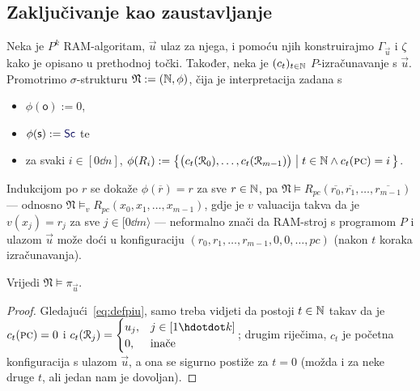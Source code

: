\subsection{Zaključivanje kao zaustavljanje}

Neka je $P^k$ RAM-algoritam, $\vec u$ ulaz za njega, i pomoću njih konstruirajmo $\Gamma_{\vec u}$ i $\zeta$ kako je opisano u prethodnoj točki.
Također, neka je $(c_t)_{t\in{\mathbb N}}$ $P$-izračunavanje s $\vec u$. Promotrimo $\sigma$-strukturu $\mathfrak N:=({\mathbb N},\phi)$, čija je interpretacija zadana s
\begin{itemize}
    \item $\phi(\mathsf o):=0$,
    \item $\phi(\mathsf s):=\f{Sc}$ te
    \item za svaki $i\in[0\dd n]$,
    $
        \phi(R_i):=\bigl\{
        \bigl(c_t(\mathcal R_{0}),\dotsc,c_t(\mathcal R_{m-1})\bigr)
        \bigm|
        t\in{\mathbb N}\land c_t(\textsc{pc})=i
		\,\bigr\}
    $.
\end{itemize}
Indukcijom po $r$ se dokaže $\phi(\overline r)=r$ za sve $r\in{\mathbb N}$, pa $\mathfrak N\models R_{pc}(\overline{r_0},\overline{r_1},\dotsc,\overline{r_{m-1}})$ --- odnosno $\mathfrak N\models_v R_{pc}(x_0,x_1,\dotsc,x_{m-1})$, gdje je $v$ valuacija takva da je $v(x_j)=r_j$ za sve $j\in[0\dd m\rangle$ --- neformalno znači da RAM-stroj s programom $P$ i ulazom $\vec u$ može doći u konfiguraciju $(r_0,r_1,\dotsc,r_{m-1},0,0,\dotsc,pc)$ (nakon $t$ koraka izračunavanja).

\begin{lema}[{name=[istinitost početne formule u $\mathfrak N$]}]\label{lm:Npiu}
Vrijedi $\mathfrak N\models\pi_{\vec u}$.
\end{lema}
\begin{proof}
Gledajući~\eqref{eq:defpiu}, samo treba vidjeti da postoji $t\in{\mathbb N}$ takav da je $c_t(\textsc{pc})=0$ i $c_t(\reg j)=\begin{cases}
u_j,&j\in[1\dd k]\\
0,&\text{inače}
\end{cases}$; drugim riječima, $c_t$ je početna konfiguracija s ulazom $\vec u$, a ona se sigurno postiže za $t=0$ (možda i za neke druge $t$, ali jedan nam je dovoljan).
\end{proof}

